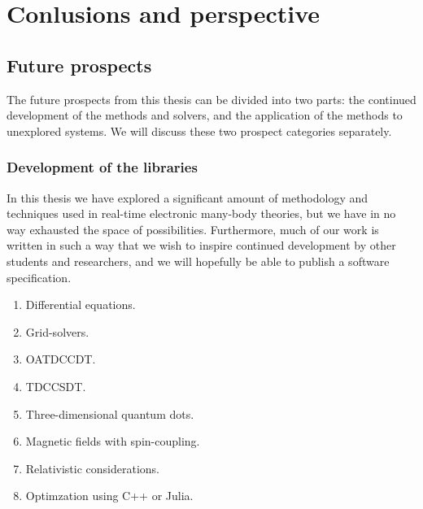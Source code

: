 \chapter{Conlusions and perspective}

    \section{Future prospects}
        The future prospects from this thesis can be divided into two parts: the
        continued development of the methods and solvers, and the application of
        the methods to unexplored systems.
        We will discuss these two prospect categories separately.

        \subsection{Development of the libraries}
            In this thesis we have explored a significant amount of methodology
            and techniques used in real-time electronic many-body theories, but
            we have in no way exhausted the space of possibilities.
            Furthermore, much of our work is written in such a way that we wish
            to inspire continued development by other students and researchers,
            and we will hopefully be able to publish a software specification.

            \begin{enumerate}
                \item Differential equations.
                \item Grid-solvers.
                \item OATDCCDT.
                \item TDCCSDT.
                \item Three-dimensional quantum dots.
                \item Magnetic fields with spin-coupling.
                \item Relativistic considerations.
                \item Optimzation using C++ or Julia.
            \end{enumerate}

